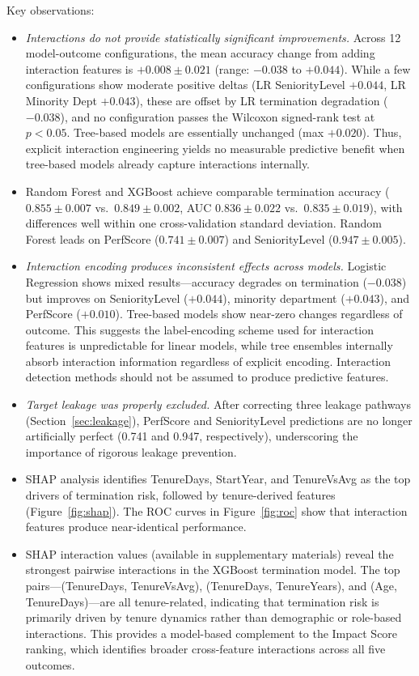 \documentclass[conference]{IEEEtran}
\begin{document}
Key observations:
\begin{itemize}
    \item \textit{Interactions do not provide statistically significant improvements.} Across 12 model-outcome configurations, the mean accuracy change from adding interaction features is $+0.008\pm0.021$ (range: $-0.038$ to $+0.044$). While a few configurations show moderate positive deltas (LR SeniorityLevel $+0.044$, LR Minority Dept $+0.043$), these are offset by LR termination degradation ($-0.038$), and no configuration passes the Wilcoxon signed-rank test at $p<0.05$. Tree-based models are essentially unchanged (max $+0.020$). Thus, explicit interaction engineering yields no measurable predictive benefit when tree-based models already capture interactions internally.
    \item Random Forest and XGBoost achieve comparable termination accuracy ($0.855\pm0.007$ vs.\ $0.849\pm0.002$, AUC $0.836\pm0.022$ vs.\ $0.835\pm0.019$), with differences well within one cross-validation standard deviation. Random Forest leads on PerfScore ($0.741\pm0.007$) and SeniorityLevel ($0.947\pm0.005$).
    \item \textit{Interaction encoding produces inconsistent effects across models.} Logistic Regression shows mixed results---accuracy degrades on termination ($-0.038$) but improves on SeniorityLevel ($+0.044$), minority department ($+0.043$), and PerfScore ($+0.010$). Tree-based models show near-zero changes regardless of outcome. This suggests the label-encoding scheme used for interaction features is unpredictable for linear models, while tree ensembles internally absorb interaction information regardless of explicit encoding. Interaction detection methods should not be assumed to produce predictive features.
    \item \textit{Target leakage was properly excluded.} After correcting three leakage pathways (Section~\ref{sec:leakage}), PerfScore and SeniorityLevel predictions are no longer artificially perfect (0.741 and 0.947, respectively), underscoring the importance of rigorous leakage prevention.
    \item SHAP analysis identifies TenureDays, StartYear, and TenureVsAvg as the top drivers of termination risk, followed by tenure-derived features (Figure~\ref{fig:shap}). The ROC curves in Figure~\ref{fig:roc} show that interaction features produce near-identical performance.
    \item SHAP interaction values (available in supplementary materials) reveal the strongest pairwise interactions in the XGBoost termination model. The top pairs---(TenureDays, TenureVsAvg), (TenureDays, TenureYears), and (Age, TenureDays)---are all tenure-related, indicating that termination risk is primarily driven by tenure dynamics rather than demographic or role-based interactions. This provides a model-based complement to the Impact Score ranking, which identifies broader cross-feature interactions across all five outcomes.
\end{itemize}
\end{document}
